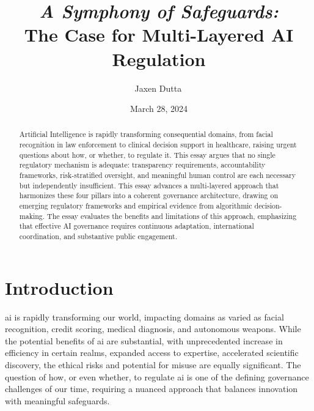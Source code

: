 \documentclass[11pt,showkeys]{essay}
\begin{document}
\title{\textit{A Symphony of Safeguards:}\\
The Case for Multi-Layered AI Regulation}

\author{Jaxen Dutta\,}

\date{March 28, 2024}

\begin{abstract}
Artificial Intelligence is rapidly transforming consequential domains, from facial recognition in law enforcement to clinical decision support in healthcare, raising urgent questions about how, or whether, to regulate it. This essay argues that no single regulatory mechanism is adequate: transparency requirements, accountability frameworks, risk-stratified oversight, and meaningful human control are each necessary but independently insufficient. This essay advances a multi-layered approach that harmonizes these four pillars into a coherent governance architecture, drawing on emerging regulatory frameworks and empirical evidence from algorithmic decision-making. The essay evaluates the benefits and limitations of this approach, emphasizing that effective AI governance requires continuous adaptation, international coordination, and substantive public engagement.
\end{abstract}


\maketitle

\section{Introduction}

\gls{ai} is rapidly transforming our world, impacting domains as varied as facial recognition, credit scoring, medical diagnosis, and autonomous weapons. While the potential benefits of \gls{ai} are substantial, with unprecedented increase in efficiency in certain realms, expanded access to expertise, accelerated scientific discovery, the ethical risks and potential for misuse are equally significant. The question of how, or even whether, to regulate \gls{ai} is one of the defining governance challenges of our time, requiring a nuanced approach that balances innovation with meaningful safeguards.
\end{document}
